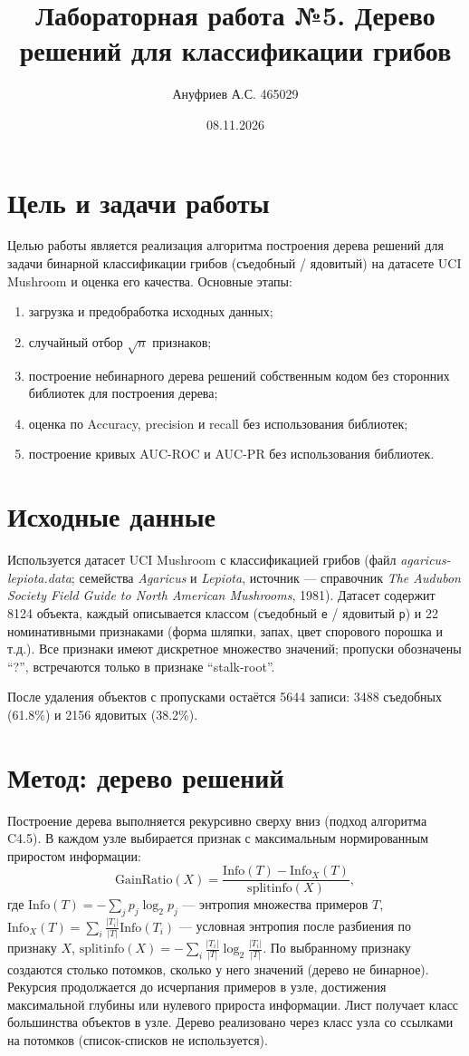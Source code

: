 \documentclass[12pt,a4paper]{article}
\title{Лабораторная работа №5. Дерево решений для классификации грибов}
\author{Ануфриев А.С. 465029}
\date{08.11.2026}
\begin{document}
\maketitle

\section{Цель и задачи работы}
Целью работы является реализация алгоритма построения дерева решений для задачи бинарной классификации грибов (съедобный / ядовитый) на датасете UCI Mushroom и оценка его качества. Основные этапы:
\begin{enumerate}
\item загрузка и предобработка исходных данных;
\item случайный отбор $\sqrt{n}$ признаков;
\item построение небинарного дерева решений собственным кодом без сторонних библиотек для построения дерева;
\item оценка по Accuracy, precision и recall без использования библиотек;
\item построение кривых AUC-ROC и AUC-PR без использования библиотек.
\end{enumerate}

\section{Исходные данные}
Используется датасет UCI Mushroom с классификацией грибов (файл \emph{agaricus-lepiota.data}; семейства \textit{Agaricus} и \textit{Lepiota}, источник --- справочник \emph{The Audubon Society Field Guide to North American Mushrooms}, 1981). Датасет содержит 8124 объекта, каждый описывается классом (съедобный \texttt{e} / ядовитый \texttt{p}) и 22 номинативными признаками (форма шляпки, запах, цвет спорового порошка и т.д.). Все признаки имеют дискретное множество значений; пропуски обозначены ``?'', встречаются только в признаке ``stalk-root''.

После удаления объектов с пропусками остаётся 5644 записи: 3488 съедобных (61.8\%) и 2156 ядовитых (38.2\%).

\section{Метод: дерево решений}
Построение дерева выполняется рекурсивно сверху вниз (подход алгоритма C4.5). В каждом узле выбирается признак с максимальным нормированным приростом информации:
\[
\mathrm{GainRatio}(X) = \frac{\mathrm{Info}(T) - \mathrm{Info}_X(T)}{\mathrm{splitinfo}(X)},
\]
где $\mathrm{Info}(T) = -\sum_{j} p_j \log_2 p_j$ --- энтропия множества примеров $T$, $\mathrm{Info}_X(T) = \sum_i \frac{|T_i|}{|T|}\mathrm{Info}(T_i)$ --- условная энтропия после разбиения по признаку $X$, $\mathrm{splitinfo}(X) = -\sum_i \frac{|T_i|}{|T|}\log_2\frac{|T_i|}{|T|}$. По выбранному признаку создаются столько потомков, сколько у него значений (дерево не бинарное). Рекурсия продолжается до исчерпания примеров в узле, достижения максимальной глубины или нулевого прироста информации. Лист получает класс большинства объектов в узле. Дерево реализовано через класс узла со ссылками на потомков (список-списков не используется).
\end{document}
